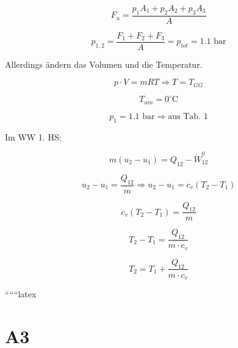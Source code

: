 \[
F_u = \frac{p_1 A_1 + p_2 A_2 + p_3 A_3}{A}
\]

\[
p_{1,2} = \frac{F_1 + F_2 + F_3}{A} = p_{tot} = 1.1 \text{ bar}
\]

Allerdings ändern das Volumen und die Temperatur.

\[
p \cdot V = mRT \Rightarrow T = T_{GG}
\]

\[
T_{um} = 0^\circ \text{C}
\]

\[
p_{1} = 1.1 \text{ bar} \Rightarrow \text{aus Tab. 1}
\]

Im WW 1. HS: 

\[
m(u_2 - u_1) = Q_{12} - \dot{W}_{12}^{0}
\]

\[
u_2 - u_1 = \frac{Q_{12}}{m} \Rightarrow u_2 - u_1 = c_v (T_2 - T_1)
\]

\[
c_v (T_2 - T_1) = \frac{Q_{12}}{m}
\]

\[
T_2 - T_1 = \frac{Q_{12}}{m \cdot c_v}
\]

\[
T_2 = T_1 + \frac{Q_{12}}{m \cdot c_v}
\]

``````latex


\section*{A3}